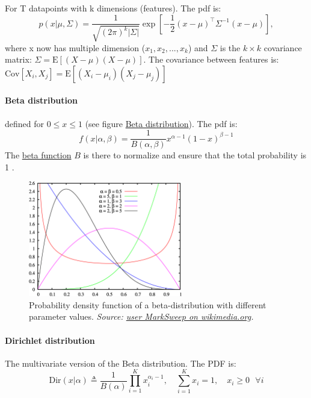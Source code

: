 \documentclass[
]{book}
\begin{document}
For T datapoints with k dimensions (features). The pdf is:
\[p(x|\mu,\Sigma) = \dfrac{1}{\sqrt{(2\pi)^k|\Sigma|}}\exp\left[-\dfrac{1}{2}(x-\mu)^\top\Sigma^{-1}(x-\mu)\right],\]
where x now has multiple dimension (\(x_1, x_2, ..., x_k\)) and \(\Sigma\)
is the \(k \times k\) covariance matrix:
\(\Sigma = \text{E}[(X-\mu)(X-\mu)]\). The covariance between features is:
\(\text{Cov}[X_i, X_j] = \text{E}[(X_i-\mu_i)(X_j-\mu_j)]\)

\hypertarget{beta-distribution}{%
\paragraph{Beta distribution}\label{beta-distribution}}

defined for \(0 \leq x \leq 1\) (see figure \protect\hyperlink{Beta_distr}{Beta
distribution}). The pdf is:
\[f(x|\alpha, \beta) = \frac{1}{B(\alpha,\beta)}x^{\alpha-1}(1-x)^{\beta-1}\]
The \href{https://en.wikipedia.org/wiki/Beta_function}{beta function} \(B\) is
there to normalize and ensure that the total probability is 1 .

\begin{figure}
\centering
\includegraphics[width=0.6\textwidth,height=\textheight]{./figures/Beta_distribution_pdf.png}
\caption{Probability density function of a beta-distribution with different
parameter values. \emph{Source: \href{https://commons.wikimedia.org/wiki/File:Beta_distribution_pdf.png}{user MarkSweep on
wikimedia.org}.}}
\end{figure}

\hypertarget{dirichlet-distribution}{%
\paragraph{Dirichlet distribution}\label{dirichlet-distribution}}

The multivariate version of the Beta distribution. The PDF is:
\[\text{Dir}({x}|{\alpha}) \triangleq \dfrac{1}{B({\alpha})}\prod\limits_{i=1}^K x_i^{\alpha_i-1},\quad \sum_{i=1}^K x_i =1, \quad x_i \geq 0 \text{ }\forall i\]
\end{document}
